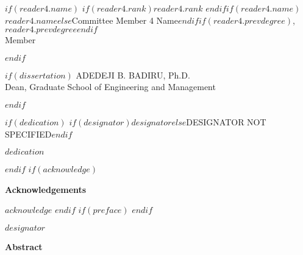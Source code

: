 \documentclass[12pt,letterpaper,toc=flat,oneside]{report}
\begin{document}
\begin{center}
  $if(reader4.name)$
  \begingroup
  \singlespace
    $if(reader4.rank)$$reader4.rank$ $endif$$if(reader4.name)$$reader4.name$$else$Committee Member 4 Name$endif$$if(reader4.prevdegree)$, $reader4.prevdegree$$endif$\\ 
    Member
    \par
  \endgroup
  \bigskip\bigskip
  $endif$
  
  $if(dissertation)$
  \bigskip
  \begingroup
  \singlespace
    ADEDEJI B. BADIRU, Ph.D.\\ 
    Dean, Graduate School of Engineering and Management
    \par
  \endgroup
  $endif$
	\end{center}
	\vfill
	\newpage
	\setcounter{page}{4}
	\renewcommand{\thepage}{\roman{page}}
$if(dedication)$
       \noindent 
       $if(designator)$$designator$$else$DESIGNATOR NOT SPECIFIED$endif$
       \vfill
       \begin{center}
	   \em{$dedication$}
	   \end{center}
	   \vfill
      \newpage
$endif$
$if(acknowledge)$
\thispagestyle{plain}
    \begin{center}
	\Large\bfseries Acknowledgements
    \end{center}
    \vspace{3em}
    $acknowledge$
 \newpage
$endif$
$if(preface)$
\newenvironment{preface}{
\chapter*{Preface}     
\addcontentsline{toc}{chapter}{Preface}
}{$preface$}
$endif$
    \thispagestyle{plain}
    \noindent $designator$
    \begin{center}
	\Large\bfseries Abstract
    \end{center}
\end{document}
